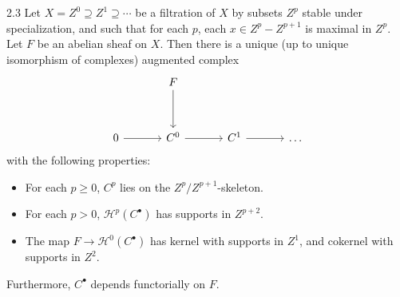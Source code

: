 \begin{bookproposition}{2.3}\label{prop:4.2.3}
Let $X=Z^0\supseteq Z^1\supseteq\cdots$ be a filtration of $X$ by subsets $Z^p$ stable under specialization, and such that for each $p$, each $x\in Z^p-Z^{p+1}$ is maximal in $Z^p$. Let $F$ be an abelian sheaf on $X$. Then there is a unique (up to unique isomorphism of complexes) augmented complex
\[
\begin{tikzcd}[row sep=1.2cm, column sep=1.2cm]
	& F \arrow[d] & & \\
	0 \arrow[r] & C^0 \arrow[r] & C^1 \arrow[r] & \dots
\end{tikzcd}
\]
with the following properties:
\begin{itemize}
\item[(a)] For each $p\geq 0$, $C^p$ lies on the $Z^p/Z^{p+1}$-skeleton.
\item[(b)] For each $p>0$, $\mathcal{H}^p(C^\bullet)$ has supports in $Z^{p+2}$.
\item[(c)] The map $F\to \mathcal{H}^{0}(C^\bullet)$ has kernel with supports in $Z^{1}$, and cokernel with supports in $Z^{2}$.
\end{itemize}
Furthermore, $C^\bullet$ depends functorially on $F$.
\end{bookproposition}

